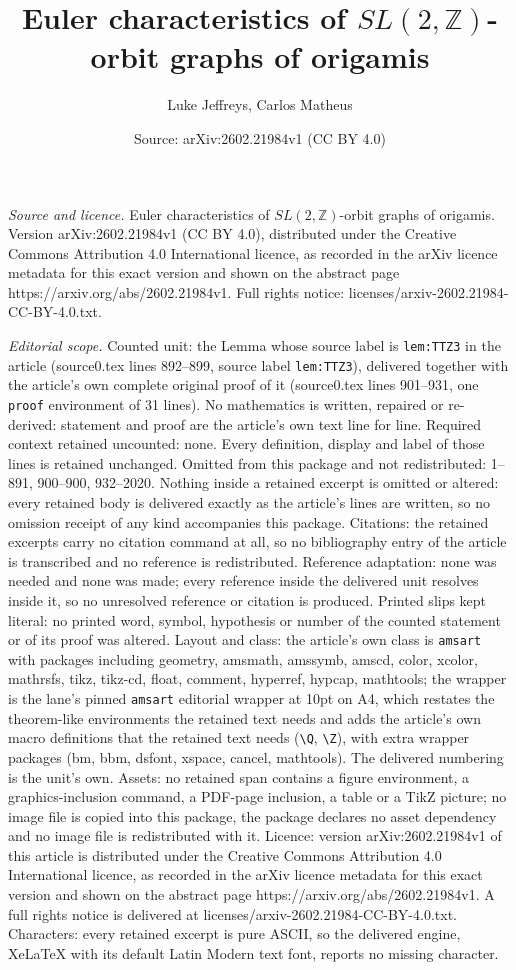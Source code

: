 \documentclass[10pt,a4paper]{amsart}
\title[Euler characteristics of $SL(2,\mathbb{Z})$-orbit graphs of ]{Euler characteristics of $SL(2,\mathbb{Z})$-orbit graphs of origamis}
\author{Luke Jeffreys, Carlos Matheus}
\date{Source: arXiv:2602.21984v1 (CC BY 4.0)}
\begin{document}
\maketitle

\noindent\emph{Source and licence.} Euler characteristics of $SL(2,\mathbb{Z})$-orbit graphs of origamis. Version arXiv:2602.21984v1 (CC BY 4.0), distributed under the Creative Commons Attribution 4.0 International licence, as recorded in the arXiv licence metadata for this exact version and shown on the abstract page https://arxiv.org/abs/2602.21984v1. Full rights notice: licenses/arxiv-2602.21984-CC-BY-4.0.txt.\par\smallskip

\noindent\textit{Editorial scope.} Counted unit: the Lemma whose source label is \texttt{lem:TTZ3} in the article (source0.tex lines 892--899, source label \texttt{lem:TTZ3}), delivered together with the article's own complete original proof of it (source0.tex lines 901--931, one \texttt{proof} environment of 31 lines). No mathematics is written, repaired or re-derived: statement and proof are the article's own text line for line. Required context retained uncounted: none. Every definition, display and label of those lines is retained unchanged. Omitted from this package and not redistributed: 1--891, 900--900, 932--2020. Nothing inside a retained excerpt is omitted or altered: every retained body is delivered exactly as the article's lines are written, so no omission receipt of any kind accompanies this package. Citations: the retained excerpts carry no citation command at all, so no bibliography entry of the article is transcribed and no reference is redistributed. Reference adaptation: none was needed and none was made; every reference inside the delivered unit resolves inside it, so no unresolved reference or citation is produced. Printed slips kept literal: no printed word, symbol, hypothesis or number of the counted statement or of its proof was altered. Layout and class: the article's own class is \texttt{amsart} with packages including geometry, amsmath, amssymb, amscd, color, xcolor, mathrsfs, tikz, tikz-cd, float, comment, hyperref, hypcap, mathtools; the wrapper is the lane's pinned \texttt{amsart} editorial wrapper at 10pt on A4, which restates the theorem-like environments the retained text needs and adds the article's own macro definitions that the retained text needs (\texttt{\textbackslash Q}, \texttt{\textbackslash Z}), with extra wrapper packages (bm, bbm, dsfont, xspace, cancel, mathtools). The delivered numbering is the unit's own. Assets: no retained span contains a figure environment, a graphics-inclusion command, a PDF-page inclusion, a table or a TikZ picture; no image file is copied into this package, the package declares no asset dependency and no image file is redistributed with it. Licence: version arXiv:2602.21984v1 of this article is distributed under the Creative Commons Attribution 4.0 International licence, as recorded in the arXiv licence metadata for this exact version and shown on the abstract page https://arxiv.org/abs/2602.21984v1. A full rights notice is delivered at licenses/arxiv-2602.21984-CC-BY-4.0.txt. Characters: every retained excerpt is pure ASCII, so the delivered engine, XeLaTeX with its default Latin Modern text font, reports no missing character.
\end{document}

